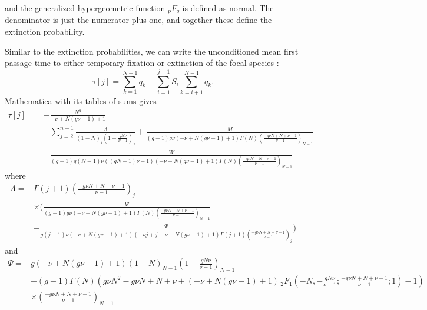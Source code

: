 and the generalized hypergeometric function ${}_pF_q$ is defined as normal. 
The denominator is just the numerator plus one, and together these define the extinction probability. 

Similar to the extinction probabilities, we can write the unconditioned mean first passage time to either temporary fixation or extinction of the focal species \cite{Nisbet1982}:
\begin{equation}
\tau[j] = \sum_{k=1}^{N-1}q_k + \sum_{i=1}^{j-1}S_{i}\sum_{k=i+1}^{N-1}q_k. 
\end{equation}
Mathematica with its tables of sums gives
\begin{align*}
\tau[j]=&-\frac{N^2}{-\nu+N (g \nu-1)+1} \\
&+\sum _{j=2}^{n-1} \frac{\Lambda}{(1-N)_j \left(1-\frac{g N \nu}{\nu-1}\right)_j} 
+\frac{M}{(g-1) g \nu (-\nu+N (g \nu-1)+1) \Gamma (N) \left(\frac{-g \nu N+N+\nu-1}{\nu-1}\right)_{N-1}} \\
&+\frac{W}{(g-1) g (N-1) \nu ((g N-1) \nu+1) (-\nu+N (g \nu-1)+1) \Gamma (N) \left(\frac{-g \nu N+N+\nu-1}{\nu-1}\right)_{N-1}}
\end{align*}
where
\begin{align*}
\Lambda = &\Gamma (j+1) \left(\frac{-g \nu N+N+\nu-1}{\nu-1}\right)_j \\
 &\times \Big(\frac{\Psi}{(g-1) g \nu (-\nu+N (g \nu-1)+1) \Gamma (N) \left(\frac{-g \nu N+N+\nu-1}{\nu-1}\right)_{N-1}} \\
 &-\frac{\Phi}{g (j+1) \nu (-\nu+N (g \nu-1)+1) (-\nu j+j-\nu+N (g \nu-1)+1) \Gamma (j+1) \left(\frac{-g \nu N+N+\nu-1}{\nu-1}\right)_j}\Big)
\end{align*}
and
\begin{align*}
\Psi =& g (-\nu+N (g \nu-1)+1) (1-N)_{N-1} \left(1-\frac{g N \nu}{\nu-1}\right)_{N-1} \\
 &+(g-1) \Gamma (N) \left(g \nu N^2-g \nu N+N+\nu+(-\nu+N (g \nu-1)+1) \, _2F_1\left(-N,-\frac{g N \nu}{\nu-1};\frac{-g \nu N+N+\nu-1}{\nu-1};1\right)-1\right) \\
 &\times \left(\frac{-g \nu N+N+\nu-1}{\nu-1}\right)_{N-1}
\end{align*}
